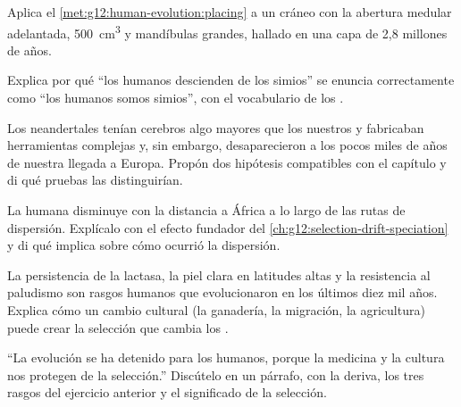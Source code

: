 \begin{exercise}[$\star\star$]\label{exo:g12:human-evolution:10}
Aplica el \cref{met:g12:human-evolution:placing} a un cráneo con la
abertura medular adelantada, \qty{500}{cm^3} y mandíbulas grandes,
hallado en una capa de 2,8 millones de años.
\end{exercise}

\begin{exercise}[$\star\star$]\label{exo:g12:human-evolution:11}
Explica por qué ``los humanos descienden de los simios'' se enuncia
correctamente como ``los humanos somos simios'', con el vocabulario de
los .
\end{exercise}

\begin{exercise}[$\star\star\star$]\label{exo:g12:human-evolution:12}
Los neandertales tenían cerebros algo mayores que los nuestros y
fabricaban herramientas complejas y, sin embargo, desaparecieron a los
pocos miles de años de nuestra llegada a Europa. Propón dos hipótesis
compatibles con el capítulo y di qué pruebas las distinguirían.
\end{exercise}

\begin{exercise}[$\star\star\star$]\label{exo:g12:human-evolution:13}
La  humana disminuye con la distancia a África a lo
largo de las rutas de dispersión. Explícalo con el efecto fundador del
\cref{ch:g12:selection-drift-speciation} y di qué implica sobre cómo
ocurrió la dispersión.
\end{exercise}

\begin{exercise}[$\star\star\star$]\label{exo:g12:human-evolution:14}
La persistencia de la lactasa, la piel clara en latitudes altas y la
resistencia al paludismo son rasgos humanos que evolucionaron en los
últimos diez mil años. Explica cómo un cambio cultural (la ganadería,
la migración, la agricultura) puede crear la selección que cambia los
.
\end{exercise}

\begin{exercise}[$\star\star\star$]\label{exo:g12:human-evolution:15}
``La evolución se ha detenido para los humanos, porque la medicina y la
cultura nos protegen de la selección.'' Discútelo en un párrafo, con la
deriva, los tres rasgos del ejercicio anterior y el significado de la
selección.
\end{exercise}

